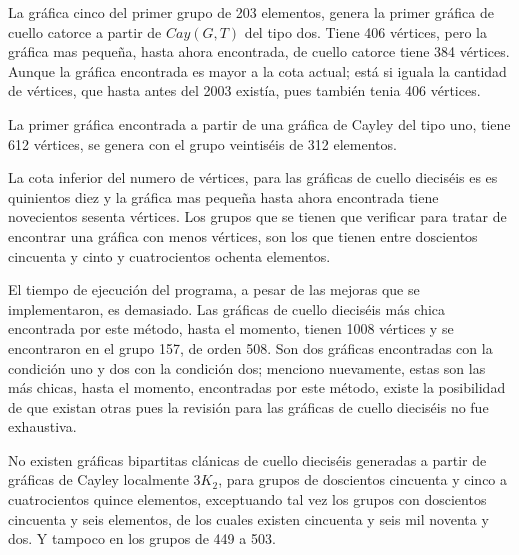 \documentclass[11pt]{book}
\theoremstyle{definition}
\begin{document}
La gráfica cinco del primer grupo de 203 elementos, genera
la primer gráfica de cuello catorce a partir de $Cay(G,T)$ del tipo
dos. Tiene 406  vértices, pero la gráfica mas pequeña,
hasta ahora encontrada, de cuello catorce tiene 384  vértices. Aunque la gráfica encontrada es mayor a la cota
actual; est\'a si iguala la cantidad de vértices, que hasta antes del
2003 existía, pues también tenia 406 vértices.

La primer gráfica encontrada a partir de una gráfica de Cayley del
tipo uno, tiene 612 vértices, se genera con el grupo
veintiséis de 312 elementos.

La cota inferior del numero de vértices, para las gráficas de cuello
dieciséis es es quinientos diez y la gráfica mas pequeña hasta ahora
encontrada tiene novecientos sesenta vértices. Los grupos que se
tienen que verificar para tratar de encontrar una gráfica con menos
vértices, son los que tienen entre doscientos cincuenta y cinto y
cuatrocientos ochenta elementos.


El tiempo de ejecución del programa, a pesar de las mejoras que se
implementaron, es demasiado. Las gráficas de cuello dieciséis m\'as
chica encontrada por este método, hasta el momento, tienen 1008
vértices y se encontraron en el grupo 157, de orden 508. Son dos
gráficas encontradas con la condición uno y dos con la condición dos;
menciono nuevamente, estas son las m\'as chicas, hasta el momento,
encontradas por este método, existe la posibilidad de que existan
otras pues la revisión para las gráficas de cuello dieciséis no fue
exhaustiva.


No existen gráficas bipartitas clánicas de cuello dieciséis generadas
a partir de gráficas de Cayley localmente $3K_2$, para grupos de
doscientos cincuenta y cinco a cuatrocientos quince elementos,
exceptuando tal vez los grupos con doscientos cincuenta y seis
elementos, de los cuales existen cincuenta y seis mil noventa y dos. Y
tampoco en los grupos de 449 a 503.






\printindex
\end{document}
